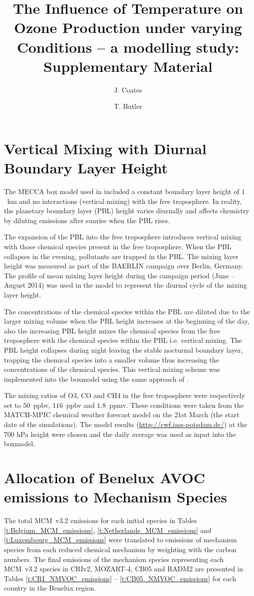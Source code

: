 \documentclass[11pt,a4paper]{article}
\title{The Influence of Temperature on Ozone Production under varying \ce{NO_x} Conditions -- a modelling study: Supplementary Material}
\author[1]{J. Coates}
\author[1]{T. Butler}
\affil[1]{Institute for Advanced Sustainability Studies, Potsdam, Germany}
\begin{document}
\maketitle

\section{Vertical Mixing with Diurnal Boundary Layer Height} 
The MECCA box model used in \citet{Coates:2015} included a constant boundary layer height of $1$~km and no interactions (vertical mixing) with the free troposphere.
In reality, the planetary boundary layer (PBL) height varies diurnally and affects chemistry by diluting emissions after sunrise when the PBL rises. 

The expansion of the PBL into the free troposphere introduces vertical mixing with those chemical species present in the free troposphere. 
When the PBL collapses in the evening, pollutants are trapped in the PBL.  
The mixing layer height was measured as part of the BAERLIN campaign \citep{Bonn:2016} over Berlin, Germany. 
The profile of mean mixing layer height during the campaign period (June -- August 2014) was used in the model to represent the diurnal cycle of the mixing layer height.

The concentrations of the chemical species within the PBL are diluted due to the larger mixing volume when the PBL height increases at the beginning of the day, also the increasing PBL height mixes the chemical species from the free troposphere with the chemical species within the PBL i.e. vertical mixing. 
The PBL height collapses during night leaving the stable nocturnal boundary layer, trapping the chemical species into a smaller volume thus increasing the concentrations of the chemical species.
This vertical mixing scheme was implemented into the boxmodel using the same approach of \citet{Lourens:2016}.

The mixing ratios of O3, CO and CH4 in the free troposphere were respectively set to $50$~ppbv, $116$~ppbv and $1.8$~ppmv. 
These conditions were taken from the MATCH-MPIC chemical weather forecast model on the 21st March (the start date of the simulations). 
The model results (\url{http://cwf.iass-potsdam.de/}) at the 700 hPa height were chosen and the daily average was used as input into the boxmodel.

\section{Allocation of Benelux AVOC emissions to Mechanism Species}
The total MCM~v3.2 emissions for each initial species in Tables \ref{t:Belgium_MCM_emissions}, \ref{t:Netherlands_MCM_emissions} and \ref{t:Luxembourg_MCM_emissions} were translated to emissions of mechanism species from each reduced chemical mechanism by weighting with the carbon numbers. 
The final emissions of the mechanism species representing each MCM~v3.2 species in CRIv2, MOZART-4, CB05 and RADM2 are presented in Tables \ref{t:CRI_NMVOC_emissions} -- \ref{t:CB05_NMVOC_emissions} for each country in the Benelux region.
\end{document}
